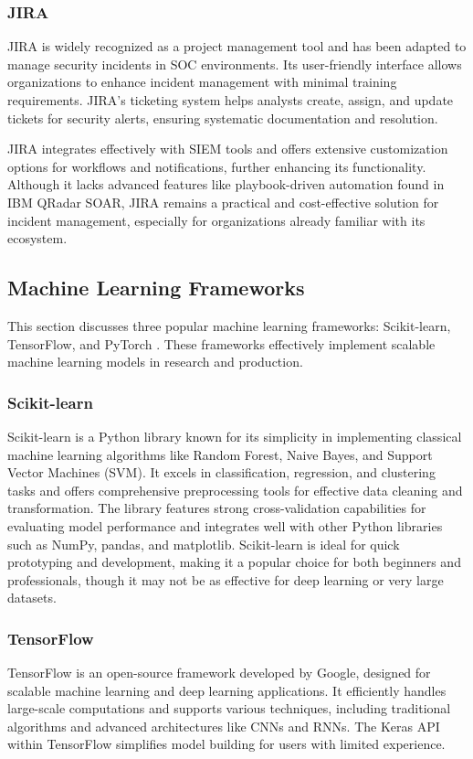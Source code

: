 \subsubsection{JIRA}
JIRA is widely recognized as a project management tool and has been adapted to manage security incidents in SOC environments. 
Its user-friendly interface allows organizations to enhance incident management with minimal training requirements. 
JIRA's ticketing system helps analysts create, assign, and update tickets for security alerts, ensuring systematic documentation and resolution.

JIRA integrates effectively with SIEM tools and offers extensive customization options for workflows and notifications, further enhancing its functionality. 
Although it lacks advanced features like playbook-driven automation found in IBM QRadar SOAR, JIRA remains a practical and cost-effective solution for incident management, especially for organizations already familiar with its ecosystem.

\subsection{Machine Learning Frameworks}

This section discusses three popular machine learning frameworks: Scikit-learn, TensorFlow, and PyTorch \parencite{mlframeworks}.
These frameworks effectively implement scalable machine learning models in research and production. 

\subsubsection{Scikit-learn}
Scikit-learn is a Python library known for its simplicity in implementing classical machine learning algorithms like Random Forest, Naive Bayes, and Support Vector Machines (SVM). 
It excels in classification, regression, and clustering tasks and offers comprehensive preprocessing tools for effective data cleaning and transformation. 
The library features strong cross-validation capabilities for evaluating model performance and integrates well with other Python libraries such as NumPy, pandas, and matplotlib. Scikit-learn is ideal for quick prototyping and development, making it a popular choice for both beginners and professionals, though it may not be as effective for deep learning or very large datasets.

\subsubsection{TensorFlow}
TensorFlow is an open-source framework developed by Google, designed for scalable machine learning and deep learning applications. 
It efficiently handles large-scale computations and supports various techniques, including traditional algorithms and advanced architectures like CNNs and RNNs. 
The Keras API within TensorFlow simplifies model building for users with limited experience.

